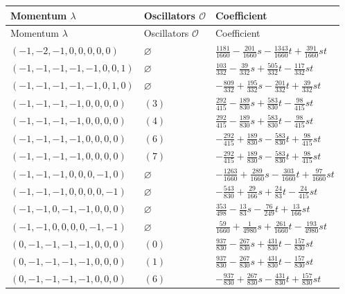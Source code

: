 \begingroup\scriptsize
\setlength{\tabcolsep}{5pt}
\begin{longtable}{@{}lll@{}}
\toprule
Momentum $\lambda$ & Oscillators $\mathcal O$ & Coefficient\\
\midrule\endfirsthead
\toprule
Momentum $\lambda$ & Oscillators $\mathcal O$ & Coefficient\\
\midrule\endhead
\bottomrule\endfoot
$(-1,-2,-1,0,0,0,0,0)$ & $\varnothing$ & $\frac{1181}{1660}-\frac{201}{1660}s-\frac{1343}{1660}t+\allowbreak \frac{391}{1660}st$\\
$(-1,-1,-1,-1,-1,0,0,1)$ & $\varnothing$ & $\frac{103}{332}-\frac{39}{332}s+\allowbreak \frac{505}{332}t-\frac{117}{332}st$\\
$(-1,-1,-1,-1,-1,0,1,0)$ & $\varnothing$ & $-\frac{809}{332}+\allowbreak \frac{195}{332}s-\frac{201}{332}t+\allowbreak \frac{39}{332}st$\\
$(-1,-1,-1,-1,0,0,0,0)$ & $(3)$ & $\frac{292}{415}-\frac{189}{830}s+\allowbreak \frac{583}{830}t-\frac{98}{415}st$\\
$(-1,-1,-1,-1,0,0,0,0)$ & $(4)$ & $\frac{292}{415}-\frac{189}{830}s+\allowbreak \frac{583}{830}t-\frac{98}{415}st$\\
$(-1,-1,-1,-1,0,0,0,0)$ & $(6)$ & $-\frac{292}{415}+\allowbreak \frac{189}{830}s-\frac{583}{830}t+\allowbreak \frac{98}{415}st$\\
$(-1,-1,-1,-1,0,0,0,0)$ & $(7)$ & $-\frac{292}{415}+\allowbreak \frac{189}{830}s-\frac{583}{830}t+\allowbreak \frac{98}{415}st$\\
$(-1,-1,-1,0,0,0,-1,0)$ & $\varnothing$ & $-\frac{1263}{1660}+\allowbreak \frac{289}{1660}s-\frac{303}{1660}t+\allowbreak \frac{97}{1660}st$\\
$(-1,-1,-1,0,0,0,0,-1)$ & $\varnothing$ & $-\frac{543}{830}+\allowbreak \frac{29}{166}s+\allowbreak \frac{24}{83}t-\frac{24}{415}st$\\
$(-1,-1,0,-1,-1,0,0,0)$ & $\varnothing$ & $\frac{353}{498}-\frac{13}{83}s-\frac{76}{249}t+\allowbreak \frac{13}{166}st$\\
$(-1,-1,0,0,0,0,-1,-1)$ & $\varnothing$ & $\frac{59}{1660}+\allowbreak \frac{1}{4980}s+\allowbreak \frac{261}{1660}t-\frac{193}{4980}st$\\
$(0,-1,-1,-1,-1,0,0,0)$ & $(0)$ & $\frac{937}{830}-\frac{267}{830}s+\allowbreak \frac{431}{830}t-\frac{157}{830}st$\\
$(0,-1,-1,-1,-1,0,0,0)$ & $(1)$ & $\frac{937}{830}-\frac{267}{830}s+\allowbreak \frac{431}{830}t-\frac{157}{830}st$\\
$(0,-1,-1,-1,-1,0,0,0)$ & $(6)$ & $-\frac{937}{830}+\allowbreak \frac{267}{830}s-\frac{431}{830}t+\allowbreak \frac{157}{830}st$\\

\end{longtable}
